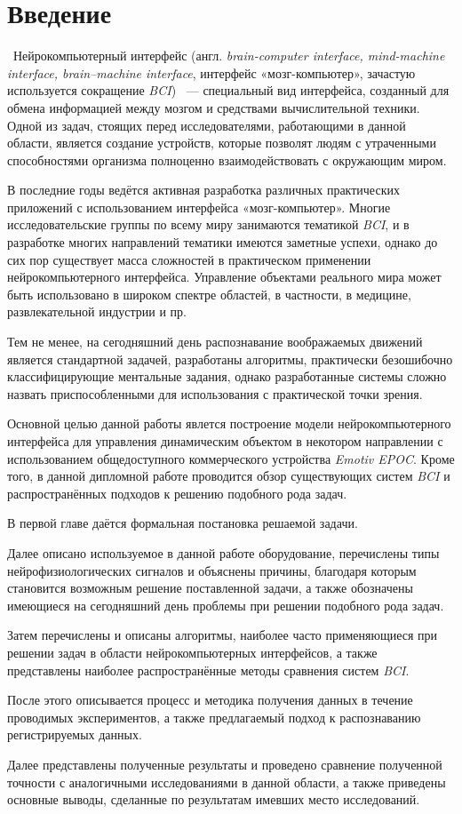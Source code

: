 \documentclass[12pt,a4paper,oneside,fleqn,leqno]{article}
\begin{document}
\section{Введение}
	\quad\,\,\,Нейрокомпьютерный интерфейс (англ. {\it brain-computer interface, mind-machine interface, brain–machine interface}, интерфейс «мозг-компьютер», зачастую используется сокращение {\it BCI}) ~--- специальный вид интерфейса, созданный для обмена информацией между мозгом и средствами вычислительной техники. Одной из задач, стоящих перед исследователями, работающими в данной области, является создание устройств, которые позволят людям с утраченными способностями организма полноценно взаимодействовать с окружающим миром.
	\par В последние годы ведётся активная разработка различных практических приложений с использованием интерфейса «мозг-компьютер». Многие исследовательские группы по всему миру занимаются тематикой {\it BCI}, и в разработке многих направлений тематики имеются заметные успехи, однако до сих пор существует масса сложностей в практическом применении нейрокомпьютерного интерфейса. Управление объектами реального мира может быть использовано в широком спектре областей, в частности, в медицине, развлекательной индустрии и пр.
	\par Тем не менее, на сегодняшний день распознавание воображаемых движений является стандартной задачей, разработаны алгоритмы, практически безошибочно классифицирующие ментальные задания, однако разработанные системы сложно назвать приспособленными для использования с практической точки зрения.
	\par Основной целью данной работы явлется построение модели нейрокомпьютерного интерфейса для управления динамическим объектом в некотором направлении с использованием общедоступного коммерческого устройства {\it Emotiv EPOC}. Кроме того, в данной дипломной работе проводится обзор существующих систем {\it BCI} и распространённых подходов к решению подобного рода задач.
	\par В первой главе даётся формальная постановка решаемой задачи.
	\par Далее описано используемое в данной работе оборудование, перечислены типы нейрофизиологических сигналов и объяснены причины, благодаря которым становится возможным решение поставленной задачи, а также обозначены имеющиеся на сегодняшний день проблемы при решении подобного рода задач.
	\par Затем перечислены и описаны алгоритмы, наиболее часто применяющиеся при решении задач в области нейрокомпьютерных интерфейсов, а также представлены наиболее распространённые методы сравнения систем {\it BCI}.
	\par После этого описывается процесс и методика получения данных в течение проводимых экспериментов, а также предлагаемый подход к распознаванию регистрируемых данных.
	\par Далее представлены полученные результаты и проведено сравнение полученной точности с аналогичными исследованиями в данной области, а также приведены основные выводы, сделанные по результатам имевших место исследований.
\end{document}
